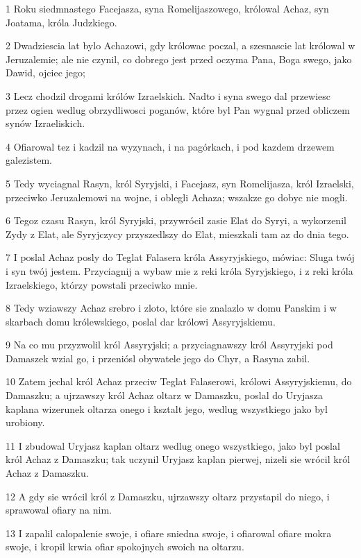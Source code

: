 \par 1 Roku siedmnastego Facejasza, syna Romelijaszowego, królowal Achaz, syn Joatama, króla Judzkiego.
\par 2 Dwadziescia lat bylo Achazowi, gdy królowac poczal, a szesnascie lat królowal w Jeruzalemie; ale nie czynil, co dobrego jest przed oczyma Pana, Boga swego, jako Dawid, ojciec jego;
\par 3 Lecz chodzil drogami królów Izraelskich. Nadto i syna swego dal przewiesc przez ogien wedlug obrzydliwosci poganów, które byl Pan wygnal przed obliczem synów Izraeliskich.
\par 4 Ofiarowal tez i kadzil na wyzynach, i na pagórkach, i pod kazdem drzewem galezistem.
\par 5 Tedy wyciagnal Rasyn, król Syryjski, i Facejasz, syn Romelijasza, król Izraelski, przeciwko Jeruzalemowi na wojne, i oblegli Achaza; wszakze go dobyc nie mogli.
\par 6 Tegoz czasu Rasyn, król Syryjski, przywrócil zasie Elat do Syryi, a wykorzenil Zydy z Elat, ale Syryjczycy przyszedlszy do Elat, mieszkali tam az do dnia tego.
\par 7 I poslal Achaz posly do Teglat Falasera króla Assyryjskiego, mówiac: Sluga twój i syn twój jestem. Przyciagnij a wybaw mie z reki króla Syryjskiego, i z reki króla Izraelskiego, którzy powstali przeciwko mnie.
\par 8 Tedy wziawszy Achaz srebro i zloto, które sie znalazlo w domu Panskim i w skarbach domu królewskiego, poslal dar królowi Assyryjskiemu.
\par 9 Na co mu przyzwolil król Assyryjski; a przyciagnawszy król Assyryjski pod Damaszek wzial go, i przeniósl obywatele jego do Chyr, a Rasyna zabil.
\par 10 Zatem jechal król Achaz przeciw Teglat Falaserowi, królowi Assyryjskiemu, do Damaszku; a ujrzawszy król Achaz oltarz w Damaszku, poslal do Uryjasza kaplana wizerunek oltarza onego i ksztalt jego, wedlug wszystkiego jako byl urobiony.
\par 11 I zbudowal Uryjasz kaplan oltarz wedlug onego wszystkiego, jako byl poslal król Achaz z Damaszku; tak uczynil Uryjasz kaplan pierwej, nizeli sie wrócil król Achaz z Damaszku.
\par 12 A gdy sie wrócil król z Damaszku, ujrzawszy oltarz przystapil do niego, i sprawowal ofiary na nim.
\par 13 I zapalil calopalenie swoje, i ofiare sniedna swoje, i ofiarowal ofiare mokra swoje, i kropil krwia ofiar spokojnych swoich na oltarzu.
